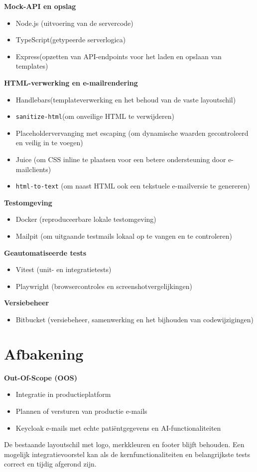 \medskip
\textbf{Mock-API en opslag}
\begin{itemize}
    \item Node.js (uitvoering van de servercode)
    \item TypeScript(getypeerde serverlogica)
    \item Express(opzetten van API-endpoints voor het laden en opslaan van templates)
\end{itemize}

\medskip
\textbf{HTML-verwerking en e-mailrendering}
\begin{itemize}
    \item Handlebars(templateverwerking en het behoud van de vaste layoutschil)
    \item \texttt{sanitize-html}(om onveilige HTML te verwijderen)
    \item Placeholdervervanging met escaping (om dynamische waarden gecontroleerd en veilig in te voegen)
    \item Juice (om CSS inline te plaatsen voor een betere ondersteuning door e-mailclients)
    \item \texttt{html-to-text} (om naast HTML ook een tekstuele e-mailversie te genereren)
\end{itemize}

\medskip
\textbf{Testomgeving}
\begin{itemize}
    \item Docker (reproduceerbare lokale testomgeving)
    \item Mailpit (om uitgaande testmails lokaal op te vangen en te controleren)
\end{itemize}

\medskip
\textbf{Geautomatiseerde tests}
\begin{itemize}
    \item Vitest (unit- en integratietests)
    \item Playwright (browsercontroles en screenshotvergelijkingen)
\end{itemize}

\medskip
\textbf{Versiebeheer}
\begin{itemize}
    \item Bitbucket (versiebeheer, samenwerking en het bijhouden van codewijzigingen)
\end{itemize}


\section{Afbakening}%
\label{vst:afbakening}
\textbf{Out-Of-Scope (OOS)}
\begin{itemize}
    \item Integratie in productieplatform
    \item Plannen of versturen van productie e-mails
    \item Keycloak e-mails met echte patiëntgegevens en AI-functionaliteiten
\end{itemize}
De bestaande layoutschil met logo, merkkleuren en footer blijft behouden. 
Een mogelijk integratievoorstel kan als de kernfunctionaliteiten en belangrijkste tests correct en tijdig afgerond zijn.

